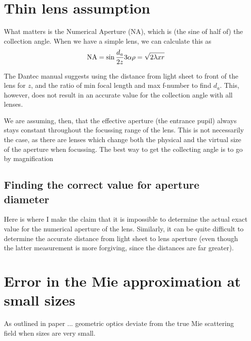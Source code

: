 \documentclass[10pt]{book}
\begin{document}
\section{Thin lens assumption}
What matters is the Numerical Aperture (NA), which is (the sine of half of) the
collection angle. When we have a simple lens, we can calculate this as
\begin{equation}
    \mathrm{NA} = \sin \frac{d_a}{2z}\\
    3\alpha \rho = \sqrt{2 \lambda x r}
\end{equation}

The Dantec manual suggests using the distance from light sheet to front of the
lens for $z$, and the ratio of min focal length and max f-number to find $d_a$.
This, however, does not result in an accurate value for the collection angle
with all lenses.

We are assuming, then, that the effective aperture (the entrance pupil) always
stays constant throughout the focussing range of the lens. This is not
necessarily the case, as there are lenses which change both the physical and the
virtual size of the aperture when focussing. The best way to get the collecting
angle is to go by magnification

\subsection{Finding the correct value for aperture diameter}
Here is where I make the claim that it is impossible to determine the actual
exact value for the numerical aperture of the lens. Similarly, it can be quite
difficult to determine the accurate distance from light sheet to lens aperture
(even though the latter measurement is more forgiving, since the distances are
far greater).

\section{Error in the Mie approximation at small sizes}
\label{sec:mie-error}
As outlined in paper ... geometric optics deviate from the true Mie scattering
field when sizes are very small.

\end{document}
